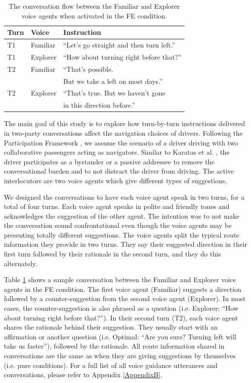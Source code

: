\begin{table}[h]
    \caption{The conversation flow between the Familiar and Explorer voice agents when activated in the FE condition.}
	\label{tab:sample-convo}
	\centering
	\begin{tabular}{l l l}
	    \hline\hline
		\textbf{Turn} & \textbf{Voice} & \textbf{Instruction} \\
		\hline
		T1 & Familiar & ``Let's go straight and then turn left.'' \\
		T1 & Explorer & ``How about turning right before that?'' \\
		\hline
		T2 & Familiar & ``That's possible.\\ 
		& & But we take a left on most days.'' \\
		T2 & Explorer & ``That's true. But we haven't gone \\
		& & in this direction before.'' \\
		\hline
	\end{tabular}
\end{table}

The main goal of this study is to explore how turn-by-turn instructions delivered in two-party conversations affect the navigation choices of drivers. Following the Participation Framework \cite{Goffman1979-GOFF}, we assume the scenario of a driver driving with two collaborative passengers acting as navigators. Similar to Karatas et al. \cite{Karatas2018}, the driver participates as a bystander or a passive addressee to remove the conversational burden and to not distract the driver from driving. The active interlocutors are two voice agents which give different types of suggestions. 

We designed the conversations to have each voice agent speak in two turns, for a total of four turns. Each voice agent speaks in polite and friendly tones \cite{Yoshiike:2011:MSI:2177868.2177871} and acknowledges the suggestion of the other agent. The intention was to not make the conversation sound confrontational even though the voice agents may be presenting totally different suggestions. The voice agents split the typical route information they provide in two turns. They say their suggested direction in their first turn followed by their rationale in the second turn, and they do this alternately. 

Table \ref{tab:sample-convo} shows a sample conversation between the Familiar and Explorer voice agents in the FE condition. The first voice agent (Familiar) suggests a direction followed by a counter-suggestion from the second voice agent (Explorer). In most cases, the counter-suggestion is also phrased as a question (i.e. Explorer: ``How about turning right before that?''). In their second turn (T2), each voice agent shares the rationale behind their suggestion. They usually start with an affirmation or another question (i.e. Optimal: ``Are you sure? Turning left will take us faster''), followed by the rationale. All route information shared in conversations are the same as when they are giving suggestions by themselves (i.e. pure conditions). For a full list of all voice guidance utterances and conversations, please refer to Appendix \ref{AppendixB}. 

